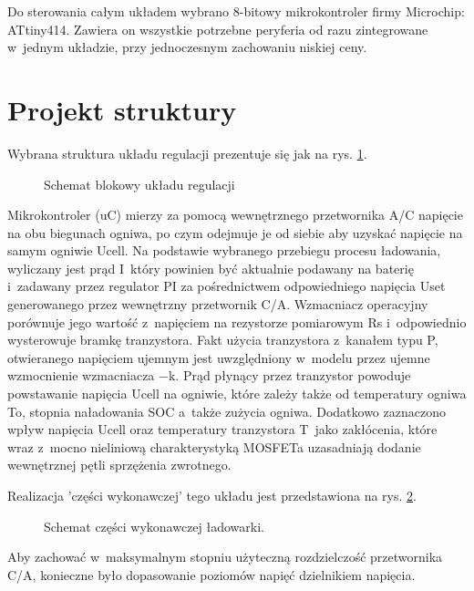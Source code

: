 \documentclass[polish,engineer]{polsl-msth}
\begin{document}
Do sterowania całym układem wybrano 8-bitowy mikrokontroler firmy Microchip: ATtiny414. Zawiera on wszystkie potrzebne peryferia od razu zintegrowane w~jednym układzie, przy jednoczesnym zachowaniu niskiej ceny. 
\section{Projekt struktury}
Wybrana struktura układu regulacji prezentuje się jak na rys. \ref{dia:reg_all}. 
\begin{figure}
     \resizebox{\linewidth}{!}{}
     \caption{Schemat blokowy układu regulacji\label{dia:reg_all}}
\end{figure}

Mikrokontroler (uC) mierzy za pomocą wewnętrznego przetwornika A/C napięcie na obu biegunach ogniwa, po czym odejmuje je od siebie aby uzyskać napięcie na samym ogniwie Ucell. Na podstawie wybranego przebiegu procesu ładowania, wyliczany jest prąd I~który powinien być aktualnie podawany na baterię i~zadawany przez regulator PI za pośrednictwem odpowiedniego napięcia Uset generowanego przez wewnętrzny przetwornik C/A. Wzmacniacz operacyjny porównuje jego wartość z~napięciem na rezystorze pomiarowym Rs i~odpowiednio wysterowuje bramkę tranzystora. Fakt użycia tranzystora z~kanałem typu P, otwieranego napięciem ujemnym jest uwzględniony w~modelu przez ujemne wzmocnienie wzmacniacza $\mathrm{-k}$. Prąd płynący przez tranzystor powoduje powstawanie napięcia Ucell na ogniwie, które zależy także od temperatury ogniwa To, stopnia naładowania SOC a~także zużycia ogniwa. Dodatkowo zaznaczono wpływ napięcia Ucell oraz temperatury tranzystora T~jako zakłócenia, które wraz z~mocno nieliniową charakterystyką MOSFETa uzasadniają dodanie wewnętrznej pętli sprzężenia zwrotnego.

Realizacja 'części wykonawczej' tego układu jest przedstawiona na rys. \ref{img:charging_circuit}. 
\begin{figure}[hbtp]
     \caption{Schemat części wykonawczej ładowarki. \label{img:charging_circuit}}
\end{figure}
Aby zachować w~maksymalnym stopniu użyteczną rozdzielczość przetwornika C/A, konieczne było dopasowanie poziomów napięć dzielnikiem napięcia.
\end{document}
